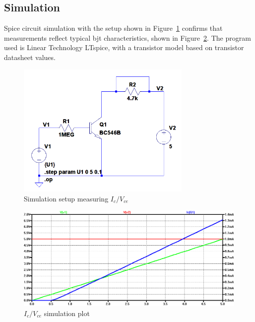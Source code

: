 \documentclass[11pt,a4paper]{article}
\begin{document}
\subsection{Simulation}\label{simulation}

Spice circuit simulation with the setup shown in Figure~\ref{fig:ic-uce_ltspice-schem}
confirms that measurements reflect typical bjt characteristics, shown in 
Figure~\ref{fig:ic-uce_ltspice-plot}.
The program used is Linear Technology LTspice, with a transistor model based on transistor datasheet values.


\begin{figure}[htbp]
    \centering
    \includegraphics[width=0.75\textwidth]{img/ic-uce_ltspice-schem.png}
    \caption{Simulation setup measuring $I_{c} / V_{ce}$}	%
    \label{fig:ic-uce_ltspice-schem}
\end{figure}

\begin{figure}[htbp]
    \centering
    \includegraphics[width=\textwidth]{img/ic-uce_ltspice-plot.png}
    \caption{$I_{c} / V_{ce}$ simulation plot}
    \label{fig:ic-uce_ltspice-plot}
\end{figure}
\end{document}

